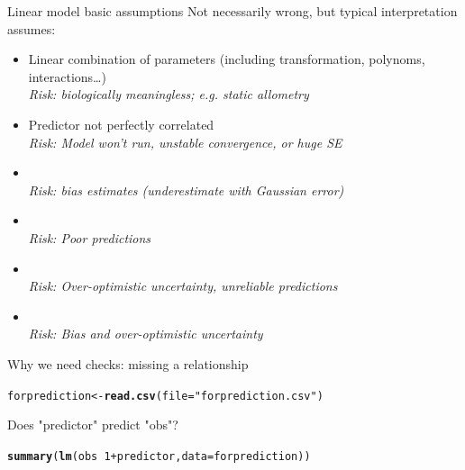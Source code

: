 \documentclass[10pt]{beamer}\usepackage[]{graphicx}\usepackage[]{color}
\makeatletter
\newcommand{\hlnum}[1]{\textcolor[rgb]{0.686,0.059,0.569}{#1}}%
\newcommand{\hlstr}[1]{\textcolor[rgb]{0.192,0.494,0.8}{#1}}%
\newcommand{\hlopt}[1]{\textcolor[rgb]{0,0,0}{#1}}%
\newcommand{\hlstd}[1]{\textcolor[rgb]{0.345,0.345,0.345}{#1}}%
\newcommand{\hlkwb}[1]{\textcolor[rgb]{0.69,0.353,0.396}{#1}}%
\newcommand{\hlkwc}[1]{\textcolor[rgb]{0.333,0.667,0.333}{#1}}%
\newcommand{\hlkwd}[1]{\textcolor[rgb]{0.737,0.353,0.396}{\textbf{#1}}}%
\newenvironment{kframe}{%
 \def\at@end@of@kframe{}%
 \ifinner\ifhmode%
  \def\at@end@of@kframe{\end{minipage}}%
  \begin{minipage}{\columnwidth}%
 \fi\fi%
 \def\FrameCommand##1{\hskip\@totalleftmargin \hskip-\fboxsep
 \colorbox{shadecolor}{##1}\hskip-\fboxsep
     \hskip-\linewidth \hskip-\@totalleftmargin \hskip\columnwidth}%
 \MakeFramed {\advance\hsize-\width
   \@totalleftmargin\z@ \linewidth\hsize
   \@setminipage}}%
 {\par\unskip\endMakeFramed%
 \at@end@of@kframe}
\newenvironment{knitrout}{}{} %
\makeatother
\begin{document}
\begin{frame}{Linear model basic assumptions}
Not necessarily wrong, but typical interpretation assumes:
 \begin{block}{}
     \begin{itemize}[<+->]
      \item Linear combination of parameters (including transformation, polynoms, interactions\dots)\\ \textit{Risk: biologically meaningless; e.g. static allometry}
      \item Predictor not perfectly correlated \\ \textit{Risk: Model won't run, unstable convergence, or huge SE}
       \item {\color{red!20!black}{Measurement error in predictors}}\\ \textit{Risk: bias estimates (underestimate with Gaussian error)}
       \item {\color{red!50!black}{Gaussian error distribution}}\\ \textit{Risk: Poor predictions}
       \item {\color{red!70!black}{Homoscedasticity (constant error variance)}}\\ \textit{Risk: Over-optimistic uncertainty, unreliable predictions}
       \item {\color{red!99!black}{Independence of error}}\\ \textit{Risk: Bias and over-optimistic uncertainty}
     \end{itemize}
 \end{block}
\end{frame}

\begin{frame}[fragile]{Why we need checks: missing a relationship}
  


\begin{knitrout}
\color{fgcolor}\begin{kframe}
\begin{alltt}
 \hlstd{forprediction} \hlkwb{<-} \hlkwd{read.csv}\hlstd{(}\hlkwc{file} \hlstd{=} \hlstr{"forprediction.csv"}\hlstd{)}
\end{alltt}
\end{kframe}
\end{knitrout}
  Does "predictor" predict "obs"? 
 \pause

\begin{knitrout}
\color{fgcolor}\begin{kframe}
\begin{alltt}
  \hlkwd{summary}\hlstd{(}\hlkwd{lm}\hlstd{(obs} \hlopt{~} \hlnum{1} \hlopt{+} \hlstd{predictor,} \hlkwc{data}\hlstd{=forprediction) )}
\end{alltt}
\end{kframe}
\end{knitrout}
\end{frame}
\end{document}
